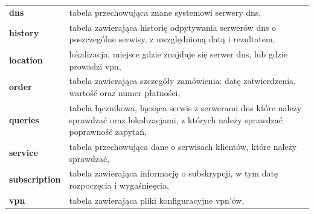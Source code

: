 \noindent
\renewcommand{\arraystretch}{1.7}
\begin{tabular}{p{2cm}p{13cm}}
  \textbf{dns} & tabela przechowująca znane systemowi serwery dns, \\
  \textbf{history} & tabela zawierająca historię odpytywania serwerów dns o poszczególne serwisy, z uwzględnioną datą i rezultatem,\\
  \textbf{location} & lokalizacja, miejsce gdzie znajduje się serwer dns, lub gdzie prowadzi vpn, \\
  \textbf{order} & tabela zawierająca szczegóły zamówienia: datę zatwierdzenia, wartość oraz numer płatności, \\
  \textbf{queries} & tabela łącznikowa, łącząca serwis z serwerami dns które należy sprawdzać oraz lokalizacjami, z których należy sprawdzać poprawność zapytań, \\
  \textbf{service} & tabela przechowująca dane o serwisach klientów, które należy sprawdzać, \\
  \textbf{subscription} & tabela zawierająca informację o subskrypcji, w tym datę rozpoczęcia i wygaśnieęcia, \\
  \textbf{vpn} & tabela zawierająca pliki konfiguracyjne vpn'ów,
\end{tabular}
